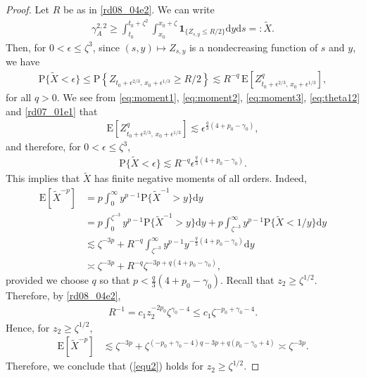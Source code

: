 \documentclass[12pt,a4paper]{article}
\newcommand{\E}{\mathrm{E}}
\renewcommand{\P}{\mathrm{P}}
\renewcommand{\d}{\mathrm{d}}
\newcommand {\deltah}{{\zeta}}
\newcommand{\<}{\langle}
\renewcommand{\>}{\rangle}
\begin{document}
 \begin{proof}
 Let $R$ be as in \eqref{rd08_04e2}.  We can write 
 \begin{align*}
 \gamma_A^{2,2} \geq  \int_{t_0}^{t_0+\deltah^2}\int_{x_0}^{x_0+\deltah}\bm{1}_{\{Z_{s,y}\leq R/2\}}\d y\d s=:\tilde{X}.
 \end{align*}
 Then, for $0<\epsilon \leq \deltah^3$, since $(s, y) \mapsto Z_{s, y}$ is a nondecreasing function of $s$ and $y$, we have
 \begin{align*}
 \P\{\tilde{X}<\epsilon\} \leq \P\left\{Z_{t_0+\epsilon^{2/3},\, x_0+\epsilon^{1/3}}\geq R/2\right\}\lesssim R^{-q}\, \E\left[Z_{t_0+\epsilon^{2/3},\, x_0+\epsilon^{1/3}}^q\right],
 \end{align*}
 for all $q > 0$. We see from \eqref{eq:moment1}, \eqref{eq:moment2}, \eqref{eq:moment3}, \eqref{eq:theta12} and \eqref{rd07_01e1}  that
 \begin{align*}
 \E\left[Z_{t_0+\epsilon^{2/3},\, x_0+\epsilon^{1/3}}^q\right] \lesssim \epsilon^{\frac{q}{3}(4+p_0-\gamma_0)},
 \end{align*}
 and therefore, for $0<\epsilon \leq \deltah^3$, 
 \begin{align*}
  \P\{\tilde{X}<\epsilon\} \lesssim R^{-q}\epsilon^{\frac{q}{3}(4+p_0-\gamma_0)}.
 \end{align*}
 This implies that $\tilde{X}$ has finite negative moments of all orders. Indeed,
 \begin{align*}
 \E[\tilde{X}^{-p}]&= p\int_0^\infty y^{p-1}\P\{\tilde{X}^{-1}>y\}\d y\\
 &=p\int_0^{\deltah^{-3}} y^{p-1}\P\{\tilde{X}^{-1}>y\}\d y + p\int_{\deltah^{-3}}^{\infty} y^{p-1}\P\{\tilde{X}<1/y\}\d y\\
 &\lesssim \deltah^{-3p} + R^{-q}\int_{\deltah^{-3}}^\infty y^{p-1}y^{-\frac{q}{3}(4+p_0-\gamma_0)}\d y\\
 &\asymp \deltah^{-3p} + R^{-q}\deltah^{-3p+q(4+p_0-\gamma_0)},
 \end{align*}
 provided we choose $q$ so that $p<\frac{q}{3}(4+p_0-\gamma_0)$.
Recall that $z_2\geq \deltah^{1/2}$. Therefore, by \eqref{rd08_04e2}, 
 \begin{align}\label{eq:R}
 R^{-1} %
     = c_1 z_2^{-2p_0}\deltah^{\gamma_0-4} \leq c_1 \deltah^{-p_0+\gamma_0-4}.
 \end{align}
 Hence, for $z_2\geq \deltah^{1/2}$,
  \begin{align*}
 \E[\tilde{X}^{-p}]&\lesssim  \deltah^{-3p} + \deltah^{(-p_0+\gamma_0-4)q -3p+q(p_0-\gamma_0+4)} \asymp \deltah^{-3p}.
 \end{align*}
Therefore, we conclude that (\ref{equ2}) holds for $z_2\geq \deltah^{1/2}$.
 \end{proof}
\end{document}
